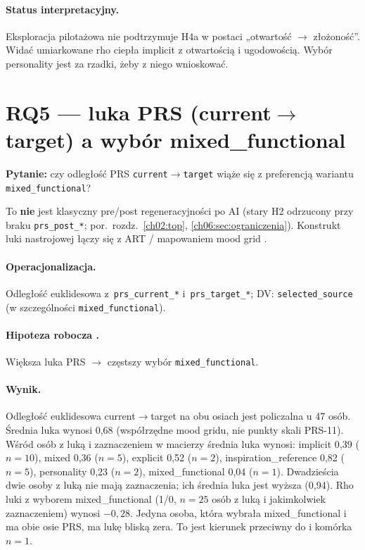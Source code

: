 \paragraph{Status interpretacyjny.}
Eksploracja pilotażowa nie podtrzymuje H4a w postaci „otwartość $\rightarrow$ złożoność”. Widać umiarkowane rho ciepła implicit z otwartością i ugodowością. Wybór personality jest za rzadki, żeby z niego wnioskować.

\section{RQ5 --- luka PRS (current$\rightarrow$target) a wybór mixed\_functional}
\label{ch08:sec:rq5}

\textbf{Pytanie:} czy odległość PRS \texttt{current}$\rightarrow$\texttt{target} wiąże się z preferencją wariantu \texttt{mixed\_functional}?

To \textbf{nie} jest klasyczny pre/post regeneracyjności po AI (stary H2 odrzucony przy braku \texttt{prs\_post\_*}; por.\ rozdz.~\ref{ch02:top}, \ref{ch06:sec:ograniczenia}).
Konstrukt luki nastrojowej łączy się z ART / mapowaniem mood grid \parencite{kaplan1995restorative}.

\paragraph{Operacjonalizacja.}
Odległość euklidesowa z~\texttt{prs\_current\_*} i~\texttt{prs\_target\_*}; DV: \texttt{selected\_source} (w szczególności \texttt{mixed\_functional}).

\paragraph{Hipoteza robocza .}
Większa luka PRS $\rightarrow$ częstszy wybór \texttt{mixed\_functional}.

\paragraph{Wynik.}
Odległość euklidesowa current$\rightarrow$target na obu osiach jest policzalna u 47 osób. Średnia luka wynosi 0,68 (współrzędne mood gridu, nie punkty skali PRS-11).
Wśród osób z luką i zaznaczeniem w macierzy średnia luka wynosi: implicit 0,39 ($n=10$), mixed 0,36 ($n=5$), explicit 0,52 ($n=2$), inspiration\_reference 0,82 ($n=5$), personality 0,23 ($n=2$), mixed\_functional 0,04 ($n=1$). Dwadzieścia dwie osoby z luką nie mają zaznaczenia; ich średnia luka jest wyższa (0,94).
Rho luki z wyborem mixed\_functional (1/0, $n=25$ osób z luką i jakimkolwiek zaznaczeniem) wynosi $-0{,}28$. Jedyna osoba, która wybrała mixed\_functional i ma obie osie PRS, ma lukę bliską zera. To jest kierunek przeciwny do  i komórka $n=1$.

